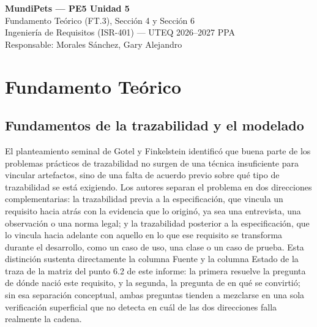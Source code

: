 \documentclass[journal,onecolumn]{IEEEtran}
\begin{document}
\begin{center}
	{\Large\bfseries MundiPets --- PE5 Unidad 5}\\[4pt]
	{\large Fundamento Teórico (FT.3), Sección 4 y Sección 6}\\[4pt]
	{\normalsize Ingeniería de Requisitos (ISR-401) --- UTEQ 2026--2027 PPA}\\[12pt]
	{\normalsize Responsable: Morales Sánchez, Gary Alejandro}
\end{center}

\vspace{1cm}

\section*{Fundamento Teórico}
\label{sec:fundamento_teorico}

\subsection*{Fundamentos de la trazabilidad y el modelado}

El planteamiento seminal de Gotel y Finkelstein \cite{gotel1994}
identificó que buena parte de los problemas prácticos de trazabilidad no
surgen de una técnica insuficiente para vincular artefactos, sino de una
falta de acuerdo previo sobre qué tipo de trazabilidad se está
exigiendo. Los autores separan el problema en dos direcciones
complementarias: la trazabilidad previa a la especificación, que vincula
un requisito hacia atrás con la evidencia que lo originó, ya sea una
entrevista, una observación o una norma legal; y la trazabilidad
posterior a la especificación, que lo vincula hacia adelante con aquello
en lo que ese requisito se transforma durante el desarrollo, como un
caso de uso, una clase o un caso de prueba. Esta distinción sustenta
directamente la columna Fuente y la columna Estado de la traza de la
matriz del punto 6.2 de este informe: la primera resuelve la pregunta de
dónde nació este requisito, y la segunda, la pregunta de en qué se
convirtió; sin esa separación conceptual, ambas preguntas tienden a
mezclarse en una sola verificación superficial que no detecta en cuál de
las dos direcciones falla realmente la cadena.
\end{document}
